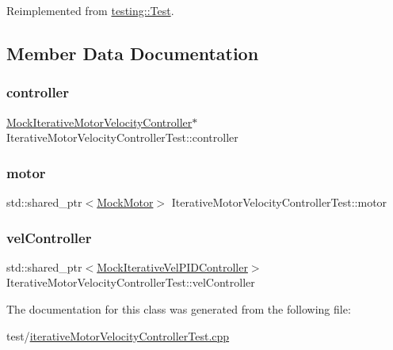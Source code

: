 Reimplemented from \mbox{\hyperlink{classtesting_1_1Test_a5f0ab439802cbe0ef7552f1a9f791923}{testing\+::\+Test}}.



\subsection{Member Data Documentation}
\mbox{\label{classIterativeMotorVelocityControllerTest_a6ad00489deb5816acc7e25c565d5a04a}} 
\subsubsection{\texorpdfstring{controller}{controller}}
{\footnotesize\ttfamily \mbox{\hyperlink{classMockIterativeMotorVelocityController}{Mock\+Iterative\+Motor\+Velocity\+Controller}}$\ast$ Iterative\+Motor\+Velocity\+Controller\+Test\+::controller\hspace{0.3cm}{\ttfamily [protected]}}

\mbox{\label{classIterativeMotorVelocityControllerTest_a3d25c32b94255545afe330ff0720354a}} 
\subsubsection{\texorpdfstring{motor}{motor}}
{\footnotesize\ttfamily std\+::shared\+\_\+ptr$<$\mbox{\hyperlink{classokapi_1_1MockMotor}{Mock\+Motor}}$>$ Iterative\+Motor\+Velocity\+Controller\+Test\+::motor\hspace{0.3cm}{\ttfamily [protected]}}

\mbox{\label{classIterativeMotorVelocityControllerTest_a924008a7dc645ea4a9daf24ac742b267}} 
\subsubsection{\texorpdfstring{velController}{velController}}
{\footnotesize\ttfamily std\+::shared\+\_\+ptr$<$\mbox{\hyperlink{classMockIterativeVelPIDController}{Mock\+Iterative\+Vel\+P\+I\+D\+Controller}}$>$ Iterative\+Motor\+Velocity\+Controller\+Test\+::vel\+Controller\hspace{0.3cm}{\ttfamily [protected]}}



The documentation for this class was generated from the following file\+:\begin{DoxyCompactItemize}
\item 
test/\mbox{\hyperlink{iterativeMotorVelocityControllerTest_8cpp}{iterative\+Motor\+Velocity\+Controller\+Test.\+cpp}}\end{DoxyCompactItemize}
